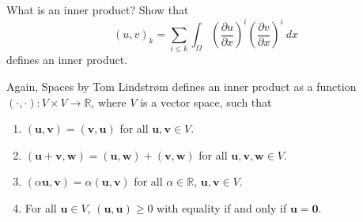 \begin{exercise}
    What is an inner product? Show that
    \begin{equation*}
        (u, v)_k = \sum_{i \leq k} \int_{\Omega} \left( \frac{\partial u}{\partial x} \right)^i \left( \frac{\partial v}{\partial x} \right)^i \ dx
    \end{equation*}
    defines an inner product.
\end{exercise}

\begin{solution}
    Again, Spaces by Tom Lindstrøm defines an inner product as a function $(\cdot, \cdot): V \times V \to \mathbb{R}$, where $V$ is a vector space, such that
    \begin{enumerate}[label=(\roman*)] %
        \item $(\boldsymbol{u}, \boldsymbol{v}) = (\boldsymbol{v}, \boldsymbol{u})$ for all $\boldsymbol{u}, \boldsymbol{v} \in V$.

        \item $(\boldsymbol{u} + \boldsymbol{v}, \boldsymbol{w}) = (\boldsymbol{u}, \boldsymbol{w}) + (\boldsymbol{v}, \boldsymbol{w})$ for all $\boldsymbol{u}, \boldsymbol{v}, \boldsymbol{w} \in V$.

        \item $(\alpha \boldsymbol{u}, \boldsymbol{v}) = \alpha (\boldsymbol{u}, \boldsymbol{v})$ for all $\alpha \in \mathbb{R}$, $\boldsymbol{u}, \boldsymbol{v} \in V$.

        \item For all $\boldsymbol{u} \in V$, $(\boldsymbol{u}, \boldsymbol{u}) \geq 0$ with equality if and only if $\boldsymbol{u} = \boldsymbol{0}$.
    \end{enumerate}


\end{solution}
